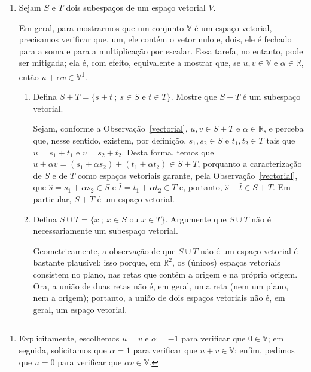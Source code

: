 \documentclass[leqno]{article}
\begin{document}
\begin{enumerate}

    \item Sejam $S$ e $T$ dois subespaços de um espaço vetorial $V$.
	
	    \begin{obs} \label{vectorial}  
		Em geral, para mostrarmos que um conjunto $\mathbb{V}$ é um espaço vetorial, precisamos verificar que, um, ele contém o vetor nulo e, dois, ele é fechado para a soma e para a multiplicação por escalar. Essa tarefa, no entanto, pode ser mitigada; ela é, com efeito, equivalente a mostrar que, se $u, v \in \mathbb{V}$ e $\alpha \in \mathbb{R}$, então $u + \alpha v \in \mathbb{V}$\footnote{Explicitamente, escolhemos $u = v$ e $\alpha = -1$ para verificar que $0 \in \mathbb{V}$; em seguida, solicitamos que $\alpha = 1$ para verificar que $u + v \in \mathbb{V}$; enfim, pedimos que $u = 0$ para verificar que $\alpha v \in \mathbb{V}$.}.
	\end{obs} 
        \begin{enumerate}

            \item Defina $S + T = \{s + t \ ; \ s \in S \mbox{ e } t \in T\}$. Mostre que $S + T$ é um subespaço vetorial.
	
	\begin{sol} 
		Sejam, conforme a Observação~\ref{vectorial}, $u, v \in S + T$ e $\alpha \in \mathbb{R}$, e perceba que, nesse sentido, existem, por definição, $s_{1}, s_{2} \in S$ e $t_{1}, t_{2} \in T$ tais que $u = s_{1} + t_{1}$ e $v = s_{2} + t_{2}$. Desta forma, temos que $u + \alpha v = (s_{1} + \alpha s_{2}) + (t_{1} + \alpha t_{2}) \in S + T$, porquanto a caracterização de $S$ e de $T$ como espaços vetoriais garante, pela Observação~\ref{vectorial}, que $\hat s = s_{1} + \alpha s_{2} \in S$ e $\hat t = t_{1} + \alpha t_{2} \in T$ e, portanto, $\hat s + \hat t \in S + T$. Em particular, $S + T$ é um espaço vetorial.   
	\end{sol} 

            \item Defina $S \cup T = \{x \ ; \ x \in S \mbox{ ou } x \in T\}$. Argumente que $S \cup T$ não é necessariamente um subespaço vetorial.
	
	\begin{sol} 
		Geometricamente, a observação de que $S \cup T$ não é um espaço vetorial é bastante plausível; isso porque, em $\mathbb{R}^{2}$, os (únicos) espaços vetoriais consistem no plano, nas retas que contêm a origem e na própria origem. Ora, a união de duas retas não é, em geral, uma reta (nem um plano, nem a origem); portanto, a união de dois espaços vetoriais não é, em geral, um espaço vetorial. 


\end{sol}
\end{enumerate}
\end{enumerate}
\end{document}
